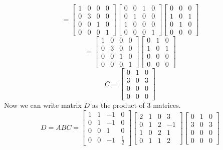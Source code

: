 \documentclass[11pt]{article}
\begin{document}
$$
=\begin{bmatrix}
    1 & 0&0&0\\
    0&3&0&0\\
    0&0&1&0\\
    0&0&0&1
\end{bmatrix}
\begin{bmatrix}
0&0&1&0\\
0&1&0&0\\
1&0&0&0\\
0&0&0&1
\end{bmatrix}
\begin{bmatrix}
0&0&0\\
1&0&1\\
0&1&0\\
0&0&0
\end{bmatrix}
$$
$$
=\begin{bmatrix}
    1 & 0&0&0\\
    0&3&0&0\\
    0&0&1&0\\
    0&0&0&1
\end{bmatrix}
\begin{bmatrix}
0&1&0\\
1&0&1\\
0&0&0\\
0&0&0
\end{bmatrix}
$$
$$
C=\begin{bmatrix}
0&1&0\\
3&0&3\\
0&0&0\\
0&0&0
\end{bmatrix}
$$
Now we can write matrix $D$ as the product of 3 matrices.
$$D=ABC=
\begin{bmatrix}
1&1&-1&0\\
0&1&-1&0\\
0&0&1&0\\
0&0&-1&\frac12
\end{bmatrix}
\begin{bmatrix}
        2 & 1 & 0 & 3\\
        0 & 1 & 2 & -1\\
        1 & 0 & 2 & 1\\
        0 & 1 & 1 & 2
    \end{bmatrix}
\begin{bmatrix}
0&1&0\\
3&0&3\\
0&0&0\\
0&0&0
\end{bmatrix}
$$
\end{document}
